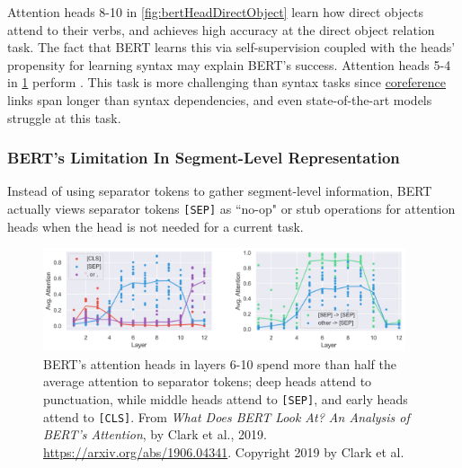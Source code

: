 \begin{figure}
\begin{minipage}{.4\textwidth}
  \label{fig:bertCoref}
\end{minipage}
\end{figure}


Attention heads 8-10 in \cref{fig:bertHeadDirectObject} learn how direct objects attend to their verbs, and achieves high accuracy at the direct object relation task. The fact that BERT learns this via self-supervision coupled with the heads' propensity for learning syntax may explain BERT's success. Attention heads 5-4 in \cref{fig:bertCoref} perform . This task is more challenging than syntax tasks since \hyperref[nlptask:coreferenceresolutionCR]{coreference} links span longer than syntax dependencies, and even state-of-the-art models struggle at this task.




\subsubsection{BERT's Limitation In Segment-Level Representation}

Instead of using separator tokens to gather segment-level information, BERT actually views separator tokens \texttt{[SEP]} as ``no-op" or stub operations for attention heads when the head is not needed for a current task. 

\begin{figure}[h]
\vspace{-5pt}
\centering
\includegraphics[width=0.95\textwidth]{imgs/bert_attentionheads_SEP.png}
\vspace{-5pt}
\caption{\footnotesize BERT's attention heads in layers 6-10 spend more than half the average attention to separator tokens; deep heads attend to punctuation, while middle heads attend to \texttt{[SEP]}, and early heads attend to \texttt{[CLS]}. From \emph{What Does BERT Look At? An Analysis of BERT's Attention}, by Clark et al., 2019. \url{https://arxiv.org/abs/1906.04341}. Copyright 2019 by Clark et al.}
\vspace{-5pt}
\label{fig:bertSEPAttention}
\end{figure}

